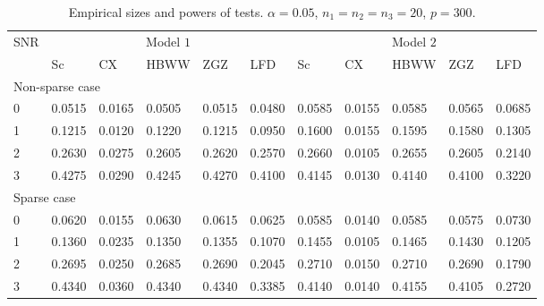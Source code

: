 \documentclass[12pt]{article} %
\theoremstyle{definition}
\begin{document}
\begin{table}[!hbp]
    \caption{Empirical sizes and powers of tests. $\alpha=0.05$, $n_1=n_2=n_3=20$, $p=300$. }
    \label{table1}
    \centering
    \begin{tabular}{*{11}{l}}
    \toprule
    \multirow{2}{*}{SNR} &\multicolumn{5}{c}{Model $1$}&
    \multicolumn{5}{c}{Model $2$} \\
        \cmidrule(r){2-6}\cmidrule(r){7-11}
& Sc & CX & HBWW & ZGZ & LFD & Sc & CX & HBWW & ZGZ & LFD \\ 
    \midrule
    \multicolumn{5}{l}{Non-sparse case}
    \\
    \midrule
  0 & 0.0515 & 0.0165 & 0.0505 & 0.0515 & 0.0480 & 0.0585 & 0.0155 & 0.0585 & 0.0565 & 0.0685 \\ 
      1 & 0.1215 & 0.0120 & 0.1220 & 0.1215 & 0.0950 & 0.1600 & 0.0155 & 0.1595 & 0.1580 & 0.1305 \\ 
      2 & 0.2630 & 0.0275 & 0.2605 & 0.2620 & 0.2570 & 0.2660 & 0.0105 & 0.2655 & 0.2605 & 0.2140 \\ 
      3 & 0.4275 & 0.0290 & 0.4245 & 0.4270 & 0.4100 & 0.4145 & 0.0130 & 0.4140 & 0.4100 & 0.3220 \\ 
    \midrule
    \multicolumn{5}{l}{Sparse case}
    \\
    \midrule
      0 & 0.0620 & 0.0155 & 0.0630 & 0.0615 & 0.0625 & 0.0585 & 0.0140 & 0.0585 & 0.0575 & 0.0730 \\ 
      1 & 0.1360 & 0.0235 & 0.1350 & 0.1355 & 0.1070 & 0.1455 & 0.0105 & 0.1465 & 0.1430 & 0.1205 \\ 
      2 & 0.2695 & 0.0250 & 0.2685 & 0.2690 & 0.2045 & 0.2710 & 0.0150 & 0.2710 & 0.2690 & 0.1790 \\ 
      3 & 0.4340 & 0.0360 & 0.4340 & 0.4340 & 0.3385 & 0.4140 & 0.0140 & 0.4155 & 0.4105 & 0.2720 \\ 
\bottomrule
\end{tabular}
\end{table}
\end{document}
